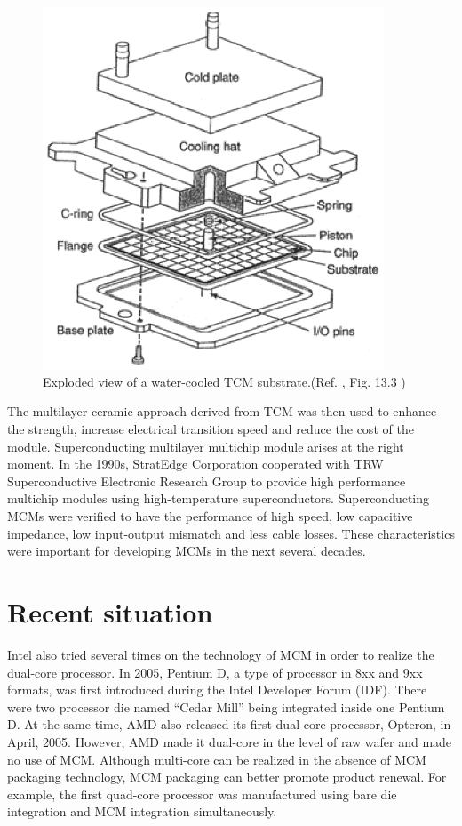 \begin{spacing}{1.5}
\begin{figure}[ht]
	\centering
	\includegraphics[width=4in, fbox]{Chapter1/TCM_substrate.eps}
	\caption{Exploded view of a water-cooled TCM substrate.(Ref. \cite{Mainframe_Packaging_TCM}, Fig. 13.3 )}
	\label{fig:TCMwatercool} 
\end{figure}

The multilayer ceramic approach derived from TCM was then used to enhance the strength, increase electrical transition speed and reduce the cost of the module. Superconducting multilayer multichip module arises at the right moment. In the 1990s, StratEdge Corporation cooperated with TRW Superconductive Electronic Research Group to provide high performance multichip modules using high-temperature superconductors.\cite{High_temperature_superconducting} Superconducting MCMs were verified to have the performance of high speed, low capacitive impedance, low input-output mismatch and less cable losses. These characteristics were important for developing MCMs in the next several decades.

\section{Recent situation}

Intel also tried several times on the technology of MCM in order to realize the dual-core processor. In 2005, Pentium D, a type of processor in 8xx and 9xx formats, was first introduced during the Intel Developer Forum (IDF). There were two processor die named “Cedar Mill” being integrated inside one Pentium D. At the same time, AMD also released its first dual-core processor, Opteron, in April, 2005. However, AMD made it dual-core in the level of raw wafer and made no use of MCM. Although multi-core can be realized in the absence of MCM packaging technology, MCM packaging can better promote product renewal. For example, the first quad-core processor was manufactured using bare die integration and MCM integration simultaneously.


\end{spacing}

